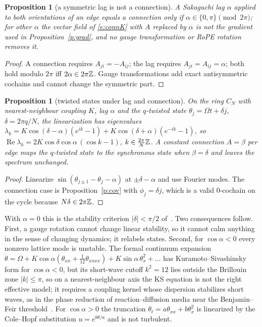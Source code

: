 \documentclass[10pt]{article}
\newtheorem{prop}[thm]{Proposition}
\theoremstyle{definition}
\begin{document}
\begin{prop}[a symmetric lag is not a connection]\label{p:sym}
A Sakaguchi lag $\alpha$ applied to both orientations of an edge equals a connection only if $\alpha\in\{0,\pi\}\pmod{2\pi}$; for other $\alpha$ the vector field of \eqref{e:connK} with $A$ replaced by $\alpha$ is not the gradient used in Proposition~\ref{p:grad}, and no gauge transformation or RoPE rotation removes it.
\end{prop}
\begin{proof}
A connection requires $A_{ji}=-A_{ij}$; the lag requires $A_{ji}=A_{ij}=\alpha$; both hold modulo $2\pi$ iff $2\alpha\in2\pi\mathbb Z$. Gauge transformations add exact antisymmetric cochains and cannot change the symmetric part.
\end{proof}

\begin{prop}[twisted states under lag and connection]\label{p:tw}
On the ring $C_N$ with nearest-neighbour coupling $K$, lag $\alpha$ and the $q$-twisted state $\theta_j=\Omega t+\delta j$, $\delta=2\pi q/N$, the linearization has eigenvalues $\lambda_k=K\cos(\delta-\alpha)(e^{ik}-1)+K\cos(\delta+\alpha)(e^{-ik}-1)$, so $\operatorname{Re}\lambda_k=2K\cos\delta\cos\alpha\,(\cos k-1)$, $k\in\frac{2\pi}{N}\mathbb Z$. A constant connection $A=\beta$ per edge maps the $q$-twisted state to the synchronous state when $\beta=\delta$ and leaves the spectrum unchanged.
\end{prop}
\begin{proof}
Linearize $\sin(\theta_{j\pm1}-\theta_j-\alpha)$ at $\pm\delta-\alpha$ and use Fourier modes. The connection case is Proposition~\ref{p:cov} with $\phi_j=\delta j$, which is a valid 0-cochain on the cycle because $N\delta\in2\pi\mathbb Z$.
\end{proof}
\noindent With $\alpha=0$ this is the stability criterion $|\delta|<\pi/2$ of~\cite{wiley}. Two consequences follow. First, a gauge rotation cannot change linear stability, so it cannot calm anything in the sense of changing dynamics; it relabels states. Second, for $\cos\alpha<0$ every nonzero lattice mode is unstable. The formal continuum expansion $\dot\theta=\Omega+K\cos\alpha(\theta_{xx}+\tfrac1{12}\theta_{xxxx})+K\sin\alpha\,\theta_x^2+\dots$ has Kuramoto--Sivashinsky form for $\cos\alpha<0$, but its short-wave cutoff $k^2=12$ lies outside the Brillouin zone $|k|\le\pi$, so on a nearest-neighbour axis the KS equation is not the right effective model; it requires a coupling kernel whose dispersion stabilizes short waves, as in the phase reduction of reaction--diffusion media near the Benjamin--Feir threshold~\cite{kuramototsuzuki,kuramoto84}. For $\cos\alpha>0$ the truncation $\theta_t=a\theta_{xx}+b\theta_x^2$ is linearized by the Cole--Hopf substitution $u=e^{b\theta/a}$ and is not turbulent.
\end{document}
